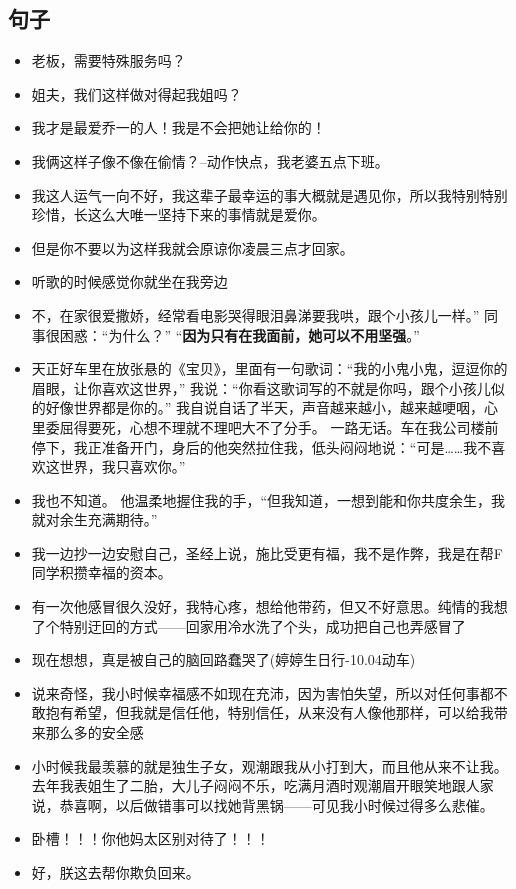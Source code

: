 \documentclass[UTF8,a4paper,8pt]{ctexart}
\begin{document}
 \subsection*{句子}
 \begin{itemize}
 	\item 老板，需要特殊服务吗？
 	\item 姐夫，我们这样做对得起我姐吗？
 	\item 我才是最爱乔一的人！我是不会把她让给你的！
 	\item 我俩这样子像不像在偷情？--动作快点，我老婆五点下班。
 	\item 我这人运气一向不好，我这辈子最幸运的事大概就是遇见你，所以我特别特别珍惜，长这么大唯一坚持下来的事情就是爱你。
 	\item 但是你不要以为这样我就会原谅你凌晨三点才回家。
 	\item 听歌的时候感觉你就坐在我旁边
 	\item 不，在家很爱撒娇，经常看电影哭得眼泪鼻涕要我哄，跟个小孩儿一样。” 同事很困惑：“为什么？” “\textbf{因为只有在我面前，她可以不用坚强}。”
 	\item 天正好车里在放张悬的《宝贝》，里面有一句歌词：“我的小鬼小鬼，逗逗你的眉眼，让你喜欢这世界，” 我说：“你看这歌词写的不就是你吗，跟个小孩儿似的好像世界都是你的。” 我自说自话了半天，声音越来越小，越来越哽咽，心里委屈得要死，心想不理就不理吧大不了分手。 一路无话。车在我公司楼前停下，我正准备开门，身后的他突然拉住我，低头闷闷地说：“可是……我不喜欢这世界，我只喜欢你。”
 	\item 我也不知道。 他温柔地握住我的手，“但我知道，一想到能和你共度余生，我就对余生充满期待。”
 	\item 我一边抄一边安慰自己，圣经上说，施比受更有福，我不是作弊，我是在帮F同学积攒幸福的资本。
 	\item 有一次他感冒很久没好，我特心疼，想给他带药，但又不好意思。纯情的我想了个特别迂回的方式——回家用冷水洗了个头，成功把自己也弄感冒了
 	\item 现在想想，真是被自己的脑回路蠢哭了(婷婷生日行-10.04动车)
 	\item 说来奇怪，我小时候幸福感不如现在充沛，因为害怕失望，所以对任何事都不敢抱有希望，但我就是信任他，特别信任，从来没有人像他那样，可以给我带来那么多的安全感
 	\item 小时候我最羡慕的就是独生子女，观潮跟我从小打到大，而且他从来不让我。去年我表姐生了二胎，大儿子闷闷不乐，吃满月酒时观潮眉开眼笑地跟人家说，恭喜啊，以后做错事可以找她背黑锅——可见我小时候过得多么悲催。
 	\item 卧槽！！！你他妈太区别对待了！！！
 	\item 好，朕这去帮你欺负回来。

\end{itemize}
\end{document}
